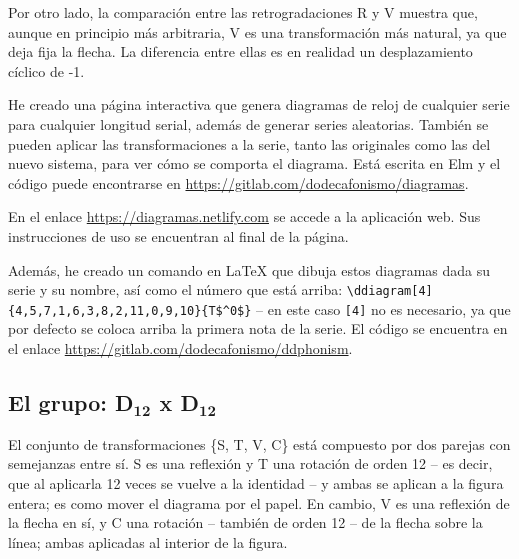 		\begin{center}
			\begin{multicols}{2}				
				
			\end{multicols}
		\end{center}
	
		Por otro lado, la comparaci\'on entre las retrogradaciones R y V muestra que, aunque en principio m\'as arbitraria, V es una transformaci\'on m\'as natural, ya que deja fija la flecha. La diferencia entre ellas es en realidad un desplazamiento c\'iclico de -1.
		
		\begin{center}
			\begin{multicols}{2}
				\ddiagram[4]{10,9,0,11,2,8,3,6,1,7,5,4}{R}				
				
				\ddiagram{4,10,9,0,11,2,8,3,6,1,7,5}{V}
			\end{multicols}
		\end{center}

		He creado una p\'agina interactiva que genera diagramas de reloj de cualquier serie para cualquier longitud serial, adem\'as de generar series aleatorias. Tambi\'en se pueden aplicar las transformaciones a la serie, tanto las originales como las del nuevo sistema, para ver c\'omo se comporta el diagrama. Est\'a escrita en Elm y el c\'odigo puede encontrarse en \url{https://gitlab.com/dodecafonismo/diagramas}.
	
		En el enlace \url{https://diagramas.netlify.com} se accede a la aplicaci\'on web. Sus instrucciones de uso se encuentran al final de la p\'agina.
		
		Adem\'as, he creado un comando en \LaTeX{} que dibuja estos diagramas dada su serie y su nombre, as\'i como el n\'umero que est\'a arriba: \verb|\ddiagram[4]{4,5,7,1,6,3,8,2,11,0,9,10}{T$^0$}| -- en este caso \verb|[4]| no es necesario, ya que por defecto se coloca arriba la primera nota de la serie. El c\'odigo se encuentra en el enlace \url{https://gitlab.com/dodecafonismo/ddphonism}.
	
	\subsection[El grupo: D$_{12}$ x D$_{12}$]{El grupo: D$_{\textbf{12}}$ x D$_{\textbf{12}}$}
		El conjunto de transformaciones \{S, T, V, C\} est\'a compuesto por dos parejas con semejanzas entre s\'i. S es una reflexi\'on y T una rotaci\'on de orden 12 -- es decir, que al aplicarla 12 veces se vuelve a la identidad -- y ambas se aplican a la figura entera; es como mover el diagrama por el papel. En cambio, V es una reflexi\'on de la flecha en s\'i, y C una rotaci\'on -- tambi\'en de orden 12 -- de la flecha sobre la l\'inea; ambas aplicadas al interior de la figura.
		
